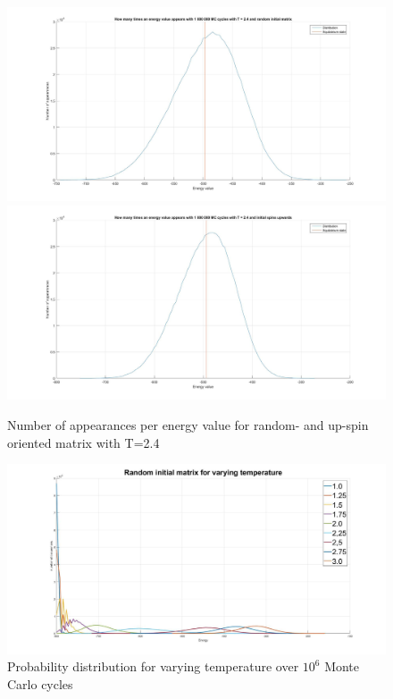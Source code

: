 \documentclass[10pt,a4paper]{article}
\begin{document}
\begin{figure}[H]
\centerline{
\includegraphics[scale=0.15]{energyappearanceT24random}
\includegraphics[scale=0.15]{energyappearanceT24upspin}
}
\caption{Number of appearances per energy value for random- and up-spin oriented matrix with T=2.4}
\label{fig:dist}
\end{figure}

\begin{figure}[H]
\centerline{
\includegraphics[scale=0.3]{energyapperanceTvarRan}
}
\caption{Probability distribution for varying temperature over $10^6$ Monte Carlo cycles}
\label{fig:distvar}
\end{figure}
\end{document}
